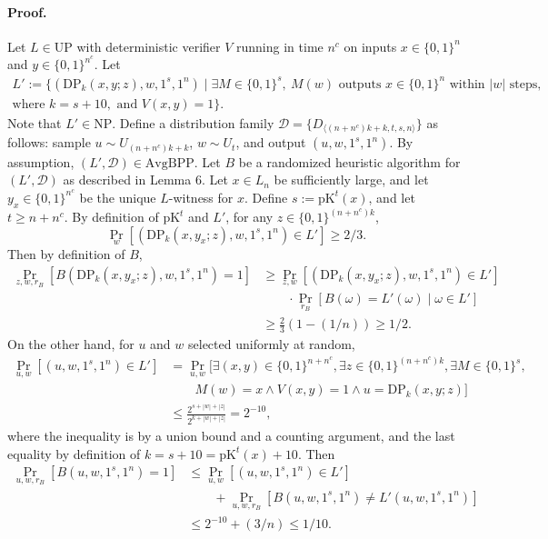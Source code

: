 \paragraph{Proof.} Let $L\in\mathrm{UP}$ with deterministic verifier $V$ running in time $n^c$ on inputs $x\in\{0,1\}^n$ and $y\in\{0,1\}^{n^c}$. Let
\begin{multline*}
L':=\{(\mathrm{DP}_k(x,y;z),w,1^s,1^n)\mid\exists M\in\{0,1\}^s,\ M(w)\text{ outputs }x\in\{0,1\}^n\text{ within }|w|\text{ steps},\\
\text{where }k=s+10,\text{ and }V(x,y)=1\}.
\end{multline*}
Note that $L'\in\mathrm{NP}$. Define a distribution family $\mathcal D=\{D_{\langle(n+n^c)k+k,t,s,n\rangle}\}$ as follows: sample $u\sim U_{(n+n^c)k+k}$, $w\sim U_t$, and output $(u,w,1^s,1^n)$. By assumption, $(L',\mathcal D)\in\mathrm{AvgBPP}$. Let $B$ be a randomized heuristic algorithm for $(L',\mathcal D)$ as described in Lemma 6.
Let $x\in L_n$ be sufficiently large, and let $y_x\in\{0,1\}^{n^c}$ be the unique $L$-witness for $x$. Define $s:=\mathrm{pK}^t(x)$, and let $t\geq n+n^c$. By definition of $\mathrm{pK}^t$ and $L'$, for any $z\in\{0,1\}^{(n+n^c)k}$,
\[\Pr_w[(\mathrm{DP}_k(x,y_x;z),w,1^s,1^n)\in L']\geq2/3.\]
Then by definition of $B$,
\begin{align*}
\Pr_{z,w,r_B}[B(\mathrm{DP}_k(x,y_x;z),w,1^s,1^n)=1]
&\geq\Pr_{z,w}[(\mathrm{DP}_k(x,y_x;z),w,1^s,1^n)\in L']\\
&\qquad\cdot\Pr_{r_B}[B(\omega)=L'(\omega)\mid\omega\in L']\\
&\geq\frac23(1-(1/n))\geq1/2.\tag{22}
\end{align*}
On the other hand, for $u$ and $w$ selected uniformly at random,
\begin{align*}
\Pr_{u,w}[(u,w,1^s,1^n)\in L']
&=\Pr_{u,w}[\exists(x,y)\in\{0,1\}^{n+n^c},\exists z\in\{0,1\}^{(n+n^c)k},\exists M\in\{0,1\}^s,\\
&\qquad M(w)=x\wedge V(x,y)=1\wedge u=\mathrm{DP}_k(x,y;z)]\\
&\leq\frac{2^{s+|w|+|z|}}{2^{k+|w|+|z|}}=2^{-10},
\end{align*}
where the inequality is by a union bound and a counting argument, and the last equality by definition of $k=s+10=\mathrm{pK}^t(x)+10$. Then
\begin{align*}
\Pr_{u,w,r_B}[B(u,w,1^s,1^n)=1]
&\leq\Pr_{u,w}[(u,w,1^s,1^n)\in L']\\
&\qquad+\Pr_{u,w,r_B}[B(u,w,1^s,1^n)\neq L'(u,w,1^s,1^n)]\\
&\leq2^{-10}+(3/n)\leq1/10.
\end{align*}
